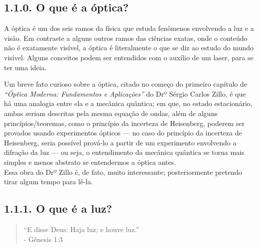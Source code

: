 \documentclass[
  a4paper]{article}
\begin{document}
\newpage

\hypertarget{o-que-uxe9-a-uxf3ptica}{%
\subsection{1.1.0. O que é a óptica?}\label{o-que-uxe9-a-uxf3ptica}}

A óptica é um dos seis ramos da física que estuda fenômenos envolvendo a
luz e a visão. Em contraste a alguns outros ramos das ciências exatas,
onde o conteúdo não é exatamente visível, a óptica é literalmente o que
se diz ao estudo do mundo visível. Alguns conceitos podem ser entendidos
com o auxílio de um laser, para se ter uma ideia.

Um breve fato curioso sobre a óptica, citado no começo do primeiro
capítulo de \emph{``Óptica Moderna: Fundamentos e Aplicações''} do Drº
Sérgio Carlos Zillo, é que há uma analogia entre ela e a mecânica
quântica; em que, no estado estacionário, ambas seriam descritas pela
mesma equação de ondas, além de alguns princípios/teoremas, como o
princípio da incerteza de Heisenberg, poderem ser provados usando
experimentos ópticos --- no caso do princípio da incerteza de
Heisenberg, seria possível prová-lo a partir de um experimento
envolvendo a difração da luz --- ou seja, o entendimento da mecânica
quântica se torna mais simples e menos abstrato se entendermos a óptica
antes.\\
Essa obra do Drº Zillo é, de fato, muito interessante; posteriormente
pretendo tirar algum tempo para lê-la.

\hypertarget{o-que-uxe9-a-luz}{%
\subsection{1.1.1. O que é a luz?}\label{o-que-uxe9-a-luz}}

\begin{quote}
``E disse Deus: Haja luz; e houve luz.''\\
- Gênesis 1:3
\end{quote}
\end{document}
